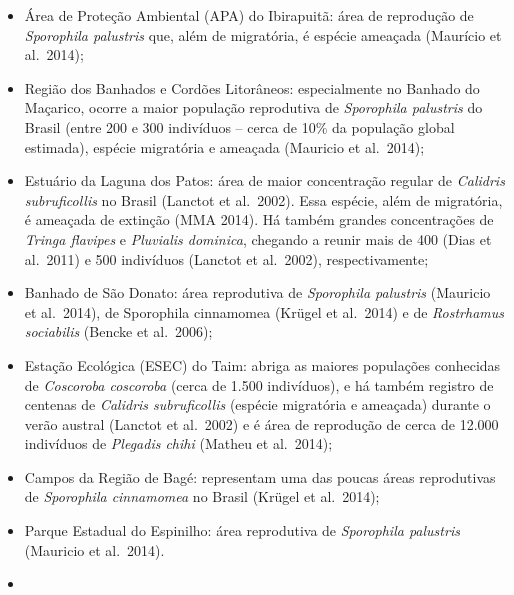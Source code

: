 \documentclass[
  oneside]{scrbook}
\begin{document}
\begin{itemize}
\item
  Área de Proteção Ambiental (APA) do Ibirapuitã: área de reprodução de \emph{Sporophila palustris} que, além de migratória, é espécie ameaçada (Maurício et al.~2014);
\item
  Região dos Banhados e Cordões Litorâneos: especialmente no Banhado do Maçarico, ocorre a maior população reprodutiva de \emph{Sporophila palustris} do Brasil (entre 200 e 300 indivíduos -- cerca de 10\% da população global estimada), espécie migratória e ameaçada (Mauricio et al.~2014);
\item
  Estuário da Laguna dos Patos: área de maior concentração regular de \emph{Calidris subruficollis} no Brasil (Lanctot et al.~2002). Essa espécie, além de migratória, é ameaçada de extinção (MMA 2014). Há também grandes concentrações de \emph{Tringa flavipes} e \emph{Pluvialis dominica}, chegando a reunir mais de 400 (Dias et al.~2011) e 500 indivíduos (Lanctot et al.~2002), respectivamente;
\item
  Banhado de São Donato: área reprodutiva de \emph{Sporophila palustris} (Mauricio et al.~2014), de Sporophila cinnamomea (Krügel et al.~2014) e de \emph{Rostrhamus sociabilis} (Bencke et al.~2006);
\item
  Estação Ecológica (ESEC) do Taim: abriga as maiores populações conhecidas de \emph{Coscoroba coscoroba} (cerca de 1.500 indivíduos), e há também registro de centenas de \emph{Calidris subruficollis} (espécie migratória e ameaçada) durante o verão austral (Lanctot et al.~2002) e é área de reprodução de cerca de 12.000 indivíduos de \emph{Plegadis chihi} (Matheu et al.~2014);
\item
  Campos da Região de Bagé: representam uma das poucas áreas reprodutivas de \emph{Sporophila cinnamomea} no Brasil (Krügel et al.~2014);
\item
  Parque Estadual do Espinilho: área reprodutiva de \emph{Sporophila palustris} (Mauricio et al.~2014).
\item

\end{itemize}
\end{document}
